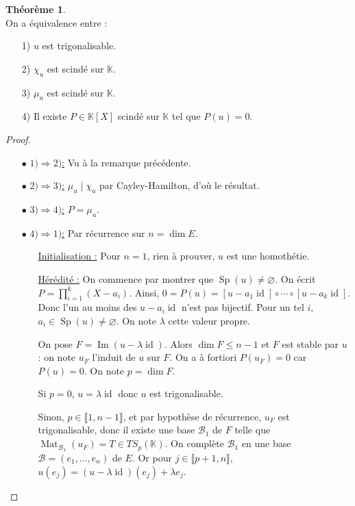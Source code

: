 \documentclass[12pt]{book}
\let\ensembleNombre\mathbb
\newcommand*\K{\ensuremath{\ensembleNombre{K}}}
\newcommand*\B{\ensuremath{\mathcal B}}
\DeclareMathOperator{\id}{id}
\DeclareMathOperator{\Sp}{Sp}
\DeclareMathOperator{\Ima}{Im}
\DeclareMathOperator{\Mat}{Mat}
\theoremstyle{definition}
\newtheorem{thme}{Théorème}[chapter]
\theoremstyle{remark}
\newenvironment{fthme}
  {\begin{mdframed}[roundcorner=10pt, linewidth=2pt]\begin{thme}}
  {\end{thme}\end{mdframed}}
\begin{document}
	\begin{fthme}\mbox{~}\\
	On a équivalence entre :
	\begin{itemize}
	\item[1)] $u$ est trigonalisable.
	\item[2)] $\chi_u$ est scindé sur $\K$.
	\item[3)] $\mu_u$ est scindé sur $\K$.
	\item[4)] Il existe $P \in \K[X]$ scindé sur $\K$ tel que $P(u) = 0$.
	\end{itemize}
	\end{fthme}
	
	\begin{proof}\mbox{~}\\
	\begin{itemize}
	\item[$\bullet$ \underline{$1)\Longrightarrow 2)$:}] Vu à la remarque précédente.
	\item[$\bullet$ \underline{$2)\Longrightarrow 3)$:}] $\mu_u \;|\; \chi_u$ par Cayley-Hamilton, d'où le résultat.
	\item[$\bullet$ \underline{$3)\Longrightarrow 4)$:}] $P = \mu_u$.
	\item[$\bullet$ \underline{$4)\Longrightarrow 1)$:}] Par récurrence sur $n = \dim E$.
		\begin{itemize}
		\item[\underline{Initialisation :}] Pour $n=1$, rien à prouver, $u$ est une homothétie.
		\item[\underline{Hérédité :}] On commence par montrer que $\Sp(u) \neq \varnothing$. On écrit $P = \prod_{i=1}^k (X-a_i)$. Ainsi, $0 = P(u) = [u - a_1 \id] \circ \cdots \circ [u - a_k\id]$. Donc l'un au moins des $u - a_i \id$ n'est pas bijectif. Pour un tel $i$, $a_i \in \Sp(u) \neq \varnothing$. On note $\lambda$ cette valeur propre.
		
		On pose $F = \Ima(u - \lambda \id)$. Alors $\dim F \leq n-1$ et $F$ est stable par $u$ : on note $u_F$ l'induit de $u$ sur $F$. On a à fortiori $P(u_F) = 0$ car $P(u) = 0$. On note $p = \dim F$.
		
		Si $p = 0$, $u = \lambda \id$ donc $u$ est trigonalisable.
		
		Sinon, $p \in \llbracket 1, n-1 \rrbracket$, et par hypothèse de récurrence, $u_F$ est trigonalisable, donc il existe une base $\B_1$ de $F$ telle que $\Mat_{\B_1}(u_F) = T \in TS_p(\K)$. On complète $\B_1$ en une base $\B = (e_1, \ldots, e_n)$ de $E$. Or pour $j \in \llbracket p+1, n \rrbracket$, $u(e_j) = (u - \lambda\id)(e_j) + \lambda e_j$.
		

\end{itemize}
\end{itemize}
\end{proof}
\end{document}
